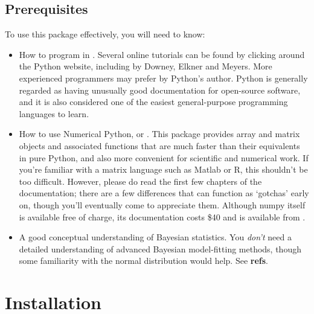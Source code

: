 \documentclass{manual}
\begin{document}
\section{Prerequisites}\label{sec:prerequisites}
To use this package effectively, you will need to know:
\begin{itemize}
	\item How to program in . Several online tutorials can be found by clicking around the Python website, including  by Downey, Elkner and Meyers. More experienced programmers may prefer  by Python's author. Python is generally regarded as having unusually good documentation for open-source software, and it is also considered one of the easiest general-purpose programming languages to learn.
	\item How to use Numerical Python, or . This package provides array and matrix objects and associated functions that are much faster than their equivalents in pure Python, and also more convenient for scientific and numerical work. If you're familiar with a matrix language such as Matlab or R, this shouldn't be too difficult. However, please do read the first few chapters of the documentation; there are a few differences that can function as `gotchas' early on, though you'll eventually come to appreciate them. Although numpy itself is available free of charge, its documentation costs \$40 and is available from . 
	\item A good conceptual understanding of Bayesian statistics. You \emph{don't} need a detailed understanding of advanced Bayesian model-fitting methods, though some familiarity with the normal distribution would help. See \textbf{refs}.
\end{itemize}



\chapter{Installation}\label{cha:installation} %
\end{document}
